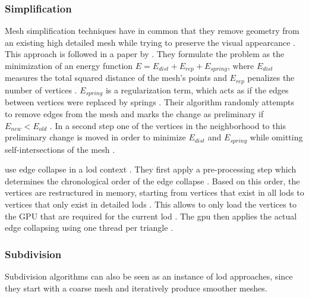 \subsubsection*{Simplification}
Mesh simplification techniques have in common that they remove geometry from an existing high detailed mesh while trying to preserve the visual appearcance \cite{realtime}.
This approach is followed in a paper by \citeauthor{hoppe_simplification} \cite{hoppe_simplification}.
They formulate the problem as the minimization of an energy function $E = E_{dist} + E_{rep} + E_{spring}$, where $E_{dist}$ measures the total squared distance of the mesh's points and $E_{rep}$ penalizes the number of vertices \cite{hoppe_simplification}.
$E_{spring}$ is a regularization term, which acts as if the edges between vertices were replaced by springs \cite{hoppe_simplification}.
Their algorithm randomly attempts to remove edges from the mesh and marks the change as preliminary if $E_{new} < E_{old}$ \cite{hoppe_simplification}.
In a second step one of the vertices in the neighborhood to this preliminary change is moved in order to minimize $E_{dist}$ and $E_{spring}$ while omitting self-intersections of the mesh \cite{hoppe_simplification}.

\citeauthor{peng_simplification} use edge collapse in a \ac{lod} context \cite{peng_simplification}.
They first apply a pre-processing step which determines the chronological order of the edge collapse \cite{peng_simplification}.
Based on this order, the vertices are restructured in memory, starting from vertices that exist in all \acp{lod} to vertices that only exist in detailed \acp{lod} \cite{peng_simplification}.
This allows to only load the vertices to the GPU that are required for the current \ac{lod} \cite{peng_simplification}.
The \ac{gpu} then applies the actual edge collapsing using one thread per triangle \cite{peng_simplification}.

\subsubsection*{Subdivision}
Subdivision algorithms can also be seen as an instance of \ac{lod} approaches, since they start with a coarse mesh and iteratively produce smoother meshes.

